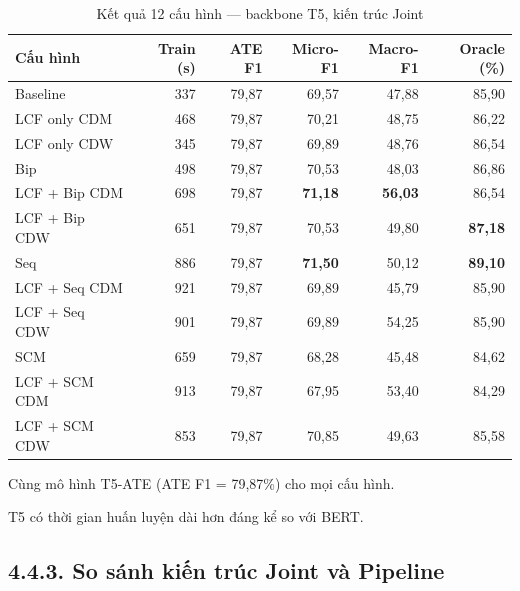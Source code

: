 \begin{table}[H]
\centering
\small
\caption{Kết quả 12 cấu hình — backbone T5, kiến trúc Joint}
\label{tab:t5_results}
\begin{threeparttable}
\begin{tabular}{@{}lrrrrr@{}}
\toprule
\textbf{Cấu hình} & \textbf{Train (s)} & \textbf{ATE F1} & \textbf{Micro-F1} & \textbf{Macro-F1} & \textbf{Oracle (\%)} \\
\midrule
Baseline               & 337 & 79,87 & 69,57 & 47,88 & 85,90 \\
\midrule
LCF only CDM           & 468 & 79,87 & 70,21 & 48,75 & 86,22 \\
LCF only CDW           & 345 & 79,87 & 69,89 & 48,76 & 86,54 \\
\midrule
Bip                    & 498 & 79,87 & 70,53 & 48,03 & 86,86 \\
LCF + Bip CDM          & 698 & 79,87 & \textbf{71,18} & \textbf{56,03} & 86,54 \\
LCF + Bip CDW          & 651 & 79,87 & 70,53 & 49,80 & \textbf{87,18} \\
\midrule
Seq                    & 886 & 79,87 & \textbf{71,50} & 50,12 & \textbf{89,10} \\
LCF + Seq CDM          & 921 & 79,87 & 69,89 & 45,79 & 85,90 \\
LCF + Seq CDW          & 901 & 79,87 & 69,89 & 54,25 & 85,90 \\
\midrule
SCM                   & 659 & 79,87 & 68,28 & 45,48 & 84,62 \\
LCF + SCM CDM         & 913 & 79,87 & 67,95 & 53,40 & 84,29 \\
LCF + SCM CDW         & 853 & 79,87 & 70,85 & 49,63 & 85,58 \\
\bottomrule
\end{tabular}
\begin{tablenotes}
  \small
  \item Cùng mô hình T5-ATE (ATE F1 = 79,87\%) cho mọi cấu hình.
  \item T5 có thời gian huấn luyện dài hơn đáng kể so với BERT.
\end{tablenotes}
\end{threeparttable}
\end{table}

\subsection{4.4.3.\; So sánh kiến trúc Joint và Pipeline}
\label{subsec:joint_vs_pipeline}

